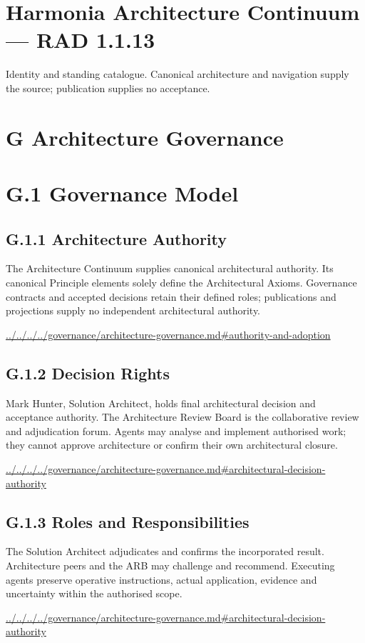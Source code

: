 \documentclass[10pt,a4paper]{article}
\begin{document}
\section*{Harmonia Architecture Continuum — RAD 1.1.13}
Identity and standing catalogue. Canonical architecture and navigation supply the source; publication supplies no acceptance.\par
\section*{G Architecture Governance}
\section*{G.1 Governance Model}
\subsection*{G.1.1 Architecture Authority}
The Architecture Continuum supplies canonical architectural authority. Its canonical Principle elements solely define the Architectural Axioms. Governance contracts and accepted decisions retain their defined roles; publications and projections supply no independent architectural authority.\par
{\footnotesize\url{../../../../governance/architecture-governance.md#authority-and-adoption}}\par
\subsection*{G.1.2 Decision Rights}
Mark Hunter, Solution Architect, holds final architectural decision and acceptance authority. The Architecture Review Board is the collaborative review and adjudication forum. Agents may analyse and implement authorised work; they cannot approve architecture or confirm their own architectural closure.\par
{\footnotesize\url{../../../../governance/architecture-governance.md#architectural-decision-authority}}\par
\subsection*{G.1.3 Roles and Responsibilities}
The Solution Architect adjudicates and confirms the incorporated result. Architecture peers and the ARB may challenge and recommend. Executing agents preserve operative instructions, actual application, evidence and uncertainty within the authorised scope.\par
{\footnotesize\url{../../../../governance/architecture-governance.md#architectural-decision-authority}}\par
\end{document}
